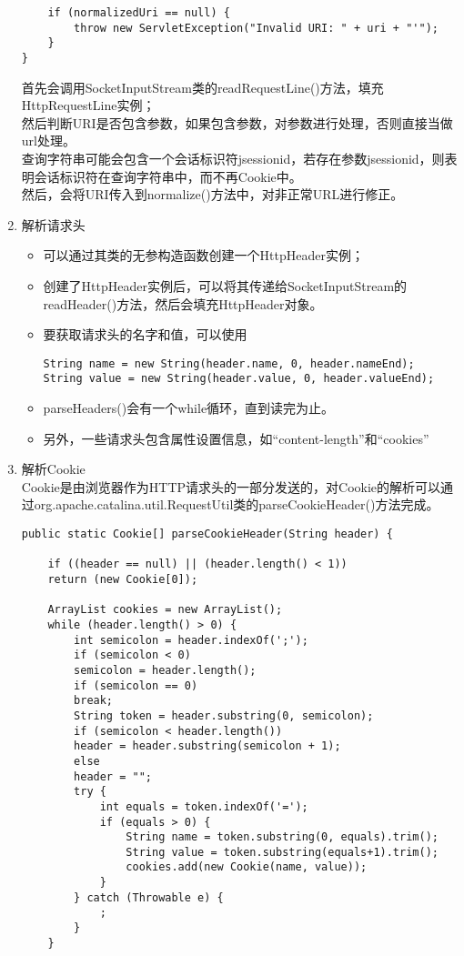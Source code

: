 \begin{enumerate}
\begin{lstlisting}
	if (normalizedUri == null) {
		throw new ServletException("Invalid URI: " + uri + "'");
	}
}
\end{lstlisting}
首先会调用SocketInputStream类的readRequestLine()方法，填充HttpRequestLine实例；\\
然后判断URI是否包含参数，如果包含参数，对参数进行处理，否则直接当做url处理。\\
查询字符串可能会包含一个会话标识符jsessionid，若存在参数jsessionid，则表明会话标识符在查询字符串中，而不再Cookie中。\\
然后，会将URI传入到normalize()方法中，对非正常URL进行修正。
\item 解析请求头\\
\begin{itemize}
	\item 可以通过其类的无参构造函数创建一个HttpHeader实例；
	\item 创建了HttpHeader实例后，可以将其传递给SocketInputStream的readHeader()方法，然后会填充HttpHeader对象。
	\item 要获取请求头的名字和值，可以使用
	\begin{lstlisting}
String name = new String(header.name, 0, header.nameEnd);
String value = new String(header.value, 0, header.valueEnd);
	\end{lstlisting}
	\item parseHeaders()会有一个while循环，直到读完为止。
	\item 另外，一些请求头包含属性设置信息，如“content-length”和“cookies”
\end{itemize}
\item 解析Cookie\\
Cookie是由浏览器作为HTTP请求头的一部分发送的，对Cookie的解析可以通过org.apache.catalina.util.RequestUtil类的parseCookieHeader()方法完成。
\begin{lstlisting}
public static Cookie[] parseCookieHeader(String header) {
	
	if ((header == null) || (header.length() < 1))
	return (new Cookie[0]);
	
	ArrayList cookies = new ArrayList();
	while (header.length() > 0) {
		int semicolon = header.indexOf(';');
		if (semicolon < 0)
		semicolon = header.length();
		if (semicolon == 0)
		break;
		String token = header.substring(0, semicolon);
		if (semicolon < header.length())
		header = header.substring(semicolon + 1);
		else
		header = "";
		try {
			int equals = token.indexOf('=');
			if (equals > 0) {
				String name = token.substring(0, equals).trim();
				String value = token.substring(equals+1).trim();
				cookies.add(new Cookie(name, value));
			}
		} catch (Throwable e) {
			;
		}
	}
	

\end{lstlisting}
\end{enumerate}
